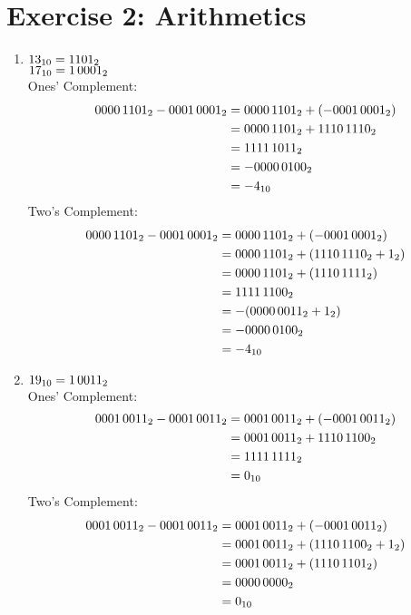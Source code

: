 \documentclass{gadsescript}
\begin{document}
\section*{Exercise 2: Arithmetics}
\begin{enumerate}[label=\alph*)]
	\item $\decnum{13} = \binnum{00001101}$\\
		$ \decnum{17} = \binnum{00010001} $\\
		Ones' Complement:
		\begin{align*}
			\binnum[8]{00001101} - \binnum[8]{00010001} &= \binnum[8]{00001101} + (-\binnum[8]{00010001})\\
			~&= \binnum[8]{00001101} + \binnum[8]{11101110}\\
			~&= \binnum[8]{11111011}\\
			~&= -\binnum[8]{00000100}\\
			~&= -\decnum{4}
		\end{align*}
		Two's Complement:
		\begin{align*}
			\binnum[8]{00001101} - \binnum[8]{00010001} &= \binnum[8]{00001101} + (-\binnum[8]{00010001})\\
			~&= \binnum[8]{00001101} + ( \binnum{11101110} + \binnum{1} )\\
			~&= \binnum[8]{00001101} + ( \binnum{11101111} )\\
			~&= \binnum{11111100}\\
			~&= -( \binnum[8]{00000011} + \binnum{1} )\\
			~&= -\binnum[8]{100}\\
			~&= -\decnum{4}
		\end{align*}

	\item $\decnum{19} = \binnum{00010011}$\\
		Ones' Complement:
		\begin{align*}
			\binnum[8]{00010011} - \binnum[8]{00010011} &= \binnum[8]{00010011} + (-\binnum[8]{00010011})\\
			~&= \binnum[8]{00010011} + \binnum[8]{11101100}\\
			~&= \binnum[8]{11111111}\\
			~&= \decnum{0}
		\end{align*}
		Two's Complement:
		\begin{align*}
			\binnum[8]{00010011} - \binnum[8]{00010011} &= \binnum[8]{00010011} + (-\binnum[8]{00010011})\\
			~&= \binnum[8]{00010011} + ( \binnum[8]{11101100} + \binnum{1} )\\
			~&= \binnum[8]{00010011} + ( \binnum[8]{11101101} )\\
			~&= \binnum[8]{0}\\
			~&= \decnum{0}
		\end{align*}


\end{enumerate}
\end{document}
